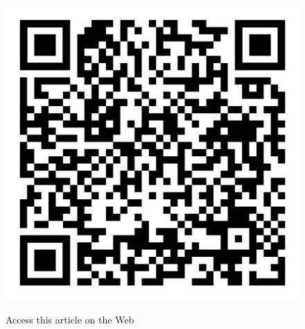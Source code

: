 \vskip 1cm

\begin{figure}[H]
\centering
\includegraphics[scale=.15]{src/Figures/QR-codes/qr-code_a-review-on-3gpp.png}

\medskip

{\large\sf Access this article on the Web}
\end{figure}
